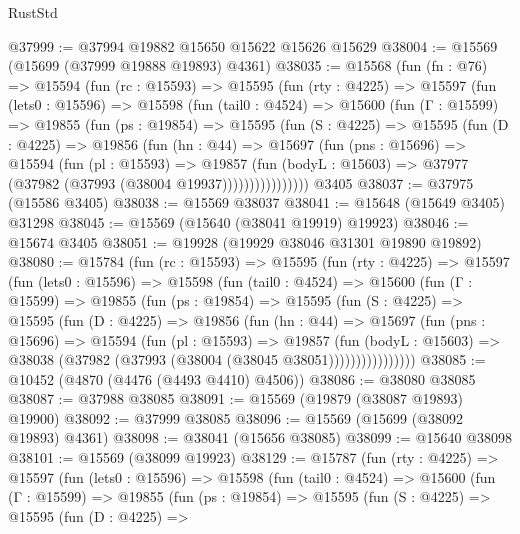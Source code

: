\begin{lexlean}{RustStd}
\begin{coremodule}
@37999 := @37994 @19882 @15650 @15622 @15626 @15629
@38004 := @15569 (@15699 (@37999 @19888 @19893) @4361)
@38035 := @15568
    (fun (fn : @76) =>
    @15594
      (fun (rc : @15593) =>
      @15595
        (fun (rty : @4225) =>
        @15597
          (fun (lets0 : @15596) =>
          @15598
            (fun (tail0 : @4524) =>
            @15600
              (fun (Γ : @15599) =>
              @19855
                (fun (ps : @19854) =>
                @15595
                  (fun (S : @4225) =>
                  @15595
                    (fun (D : @4225) =>
                    @19856
                      (fun (hn : @44) =>
                      @15697
                        (fun (pns : @15696) =>
                        @15594
                          (fun (pl : @15593) =>
                          @19857
                            (fun (bodyL : @15603) =>
                            @37977 (@37982 (@37993 (@38004 @19937))))))))))))))))
    @3405
@38037 := @37975 (@15586 @3405)
@38038 := @15569 @38037
@38041 := @15648 (@15649 @3405) @31298
@38045 := @15569 (@15640 (@38041 @19919) @19923)
@38046 := @15674 @3405
@38051 := @19928 (@19929 @38046 @31301 @19890 @19892)
@38080 := @15784
    (fun (rc : @15593) =>
    @15595
      (fun (rty : @4225) =>
      @15597
        (fun (lets0 : @15596) =>
        @15598
          (fun (tail0 : @4524) =>
          @15600
            (fun (Γ : @15599) =>
            @19855
              (fun (ps : @19854) =>
              @15595
                (fun (S : @4225) =>
                @15595
                  (fun (D : @4225) =>
                  @19856
                    (fun (hn : @44) =>
                    @15697
                      (fun (pns : @15696) =>
                      @15594
                        (fun (pl : @15593) =>
                        @19857
                          (fun (bodyL : @15603) =>
                          @38038 (@37982 (@37993 (@38004 (@38045 @38051))))))))))))))))
@38085 := @10452 (@4870 (@4476 (@4493 @4410) @4506))
@38086 := @38080 @38085
@38087 := @37988 @38085
@38091 := @15569 (@19879 (@38087 @19893) @19900)
@38092 := @37999 @38085
@38096 := @15569 (@15699 (@38092 @19893) @4361)
@38098 := @38041 (@15656 @38085)
@38099 := @15640 @38098
@38101 := @15569 (@38099 @19923)
@38129 := @15787
    (fun (rty : @4225) =>
    @15597
      (fun (lets0 : @15596) =>
      @15598
        (fun (tail0 : @4524) =>
        @15600
          (fun (Γ : @15599) =>
          @19855
            (fun (ps : @19854) =>
            @15595
              (fun (S : @4225) =>
              @15595
                (fun (D : @4225) =>

\end{coremodule}
\end{lexlean}

